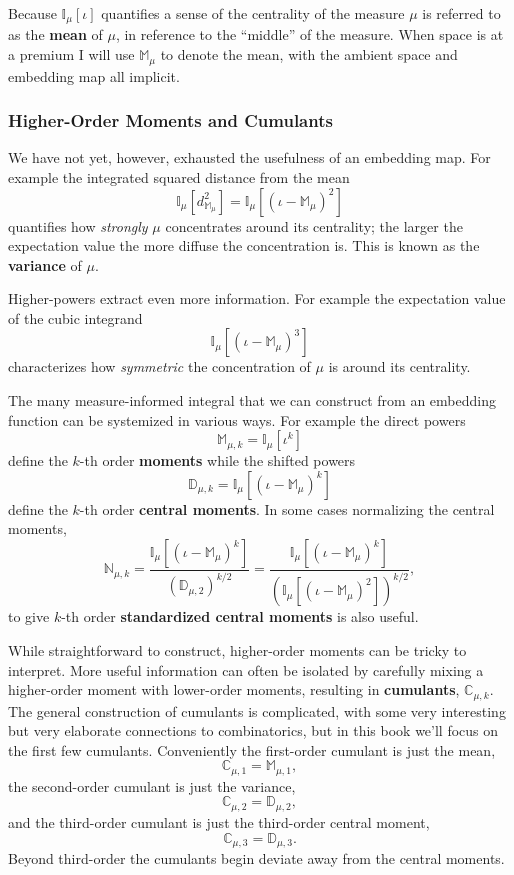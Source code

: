 \documentclass[
  letterpaper,
  DIV=11,
  numbers=noendperiod]{scrartcl}
\begin{document}
Because \(\mathbb{I}_{\mu} \left[ \iota \right]\) quantifies a sense of
the centrality of the measure \(\mu\) is referred to as the
\textbf{mean} of \(\mu\), in reference to the ``middle'' of the measure.
When space is at a premium I will use \(\mathbb{M}_{\mu}\) to denote the
mean, with the ambient space and embedding map all implicit.

\hypertarget{higher-order-moments-and-cumulants}{%
\subsubsection{Higher-Order Moments and
Cumulants}\label{higher-order-moments-and-cumulants}}

We have not yet, however, exhausted the usefulness of an embedding map.
For example the integrated squared distance from the mean \[
\mathbb{I}_{\mu} \left[ d_{\mathbb{M}_{\mu}}^{2} \right]
=
\mathbb{I}_{\mu} \left[ (\iota - \mathbb{M}_{\mu})^{2} \right]
\] quantifies how \emph{strongly} \(\mu\) concentrates around its
centrality; the larger the expectation value the more diffuse the
concentration is. This is known as the \textbf{variance} of \(\mu\).

Higher-powers extract even more information. For example the expectation
value of the cubic integrand \[
\mathbb{I}_{\mu} \left[ (\iota - \mathbb{M}_{\mu})^{3} \right]
\] characterizes how \emph{symmetric} the concentration of \(\mu\) is
around its centrality.

The many measure-informed integral that we can construct from an
embedding function can be systemized in various ways. For example the
direct powers \[
\mathbb{M}_{\mu, k} = \mathbb{I}_{\mu} \left[ \iota^{k} \right]
\] define the \(k\)-th order \textbf{moments} while the shifted powers
\[
\mathbb{D}_{\mu, k} =
\mathbb{I}_{\mu} \left[ (\iota - \mathbb{M}_{\mu})^{k} \right]
\] define the \(k\)-th order \textbf{central moments}. In some cases
normalizing the central moments, \[
\mathbb{N}_{\mu, k} =
\frac{ \mathbb{I}_{\mu} \left[ (\iota - \mathbb{M}_{\mu})^{k} \right] }
{ (\mathbb{D}_{\mu, 2})^{k / 2} }
=
\frac{ \mathbb{I}_{\mu} \left[ (\iota - \mathbb{M}_{\mu})^{k} \right] }
{ \left(
    \mathbb{I}_{\mu} \left[ (\iota - \mathbb{M}_{\mu})^{2} \right]
  \right)^{k / 2} },
\] to give \(k\)-th order \textbf{standardized central moments} is also
useful.

While straightforward to construct, higher-order moments can be tricky
to interpret. More useful information can often be isolated by carefully
mixing a higher-order moment with lower-order moments, resulting in
\textbf{cumulants}, \(\mathbb{C}_{\mu, k}\). The general construction of
cumulants is complicated, with some very interesting but very elaborate
connections to combinatorics, but in this book we'll focus on the first
few cumulants. Conveniently the first-order cumulant is just the mean,
\[
\mathbb{C}_{\mu, 1} = \mathbb{M}_{\mu, 1},
\] the second-order cumulant is just the variance, \[
\mathbb{C}_{\mu, 2} = \mathbb{D}_{\mu, 2},
\] and the third-order cumulant is just the third-order central moment,
\[
\mathbb{C}_{\mu, 3} = \mathbb{D}_{\mu, 3}.
\] Beyond third-order the cumulants begin deviate away from the central
moments.
\end{document}
